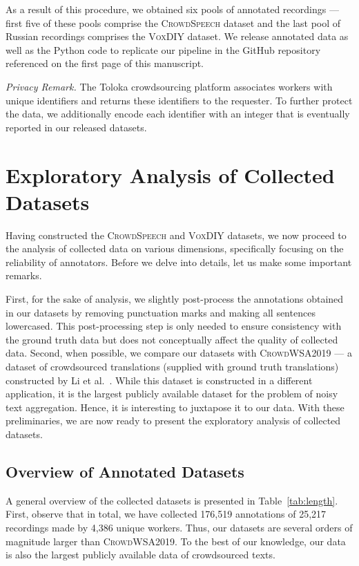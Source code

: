 \documentclass{article}
\newcommand{\speech}{\textsc{CrowdSpeech}}
\newcommand{\vox}{\textsc{VoxDIY}}
\newcommand{\crowd}{\textsc{CrowdWSA2019}}
\begin{document}
As a result of this procedure, we obtained six pools of annotated recordings --- first five of these pools comprise the \speech{} dataset and the last pool of Russian recordings comprises the \vox{} dataset. We release annotated data as well as the Python code to replicate our pipeline in the GitHub repository referenced on the first page of this manuscript.

\emph{Privacy Remark.} The Toloka crowdsourcing platform associates workers with unique identifiers and returns these identifiers to the requester. To further protect the data, we additionally encode each identifier with an integer that is eventually reported in our released datasets. 

\section{\label{section:analysis}Exploratory Analysis of Collected Datasets}

Having constructed the \speech{} and \vox{} datasets, we now proceed to the analysis of collected data on various dimensions, specifically focusing on the reliability of annotators. Before we delve into details, let us make some important remarks.

First, for the sake of analysis, we slightly post-process the annotations obtained in our datasets by removing punctuation marks and making all sentences lowercased. This post-processing step is only needed to ensure consistency with the ground truth data but does not conceptually affect the quality of collected data. Second, when possible, we compare our datasets with \crowd{} --- a dataset of crowdsourced translations (supplied with ground truth translations) constructed by Li et al.~\citep{li19crowdwsa}. While this dataset is constructed in a different application, it is the largest publicly available dataset for the problem of noisy text aggregation. Hence, it is interesting to juxtapose it to our data. With these preliminaries, we are now ready to present the exploratory analysis of collected datasets.

\subsection{Overview of Annotated Datasets}

A general overview of the collected datasets is presented in Table~\ref{tab:length}. First, observe that in total, we have collected 176,519 annotations of 25,217 recordings made by 4,386 unique workers. Thus, our datasets are several orders of magnitude larger than \crowd{}. To the best of our knowledge, our data is also the largest publicly available data of crowdsourced texts. 
\end{document}
